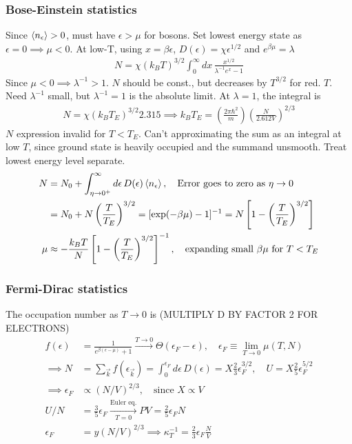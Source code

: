 \documentclass[a4paper, english, 12pt]{article}
\newcommand{\eps}{\epsilon}
\newcommand{\closed}[1]{\left( #1 \right)}
\newcommand{\bracket}[1]{\left[ #1 \right]}
\begin{document}
\begin{multicols*}{2}
\subsubsection*{\scriptsize Bose-Einstein statistics}
Since $\expval{n_\eps}>0$, must have $\eps>\mu$ for bosons. Set lowest energy state as $\eps=0\implies\mu<0$. At low-T, using $x=\beta\eps$, $D(\eps)=\chi \eps^{1/2}$ and $e^{\beta\mu}=\lambda$ 
\begin{align*}
    N = \chi (k_B T)^{3/2} \int_0^\infty dx\, \frac{x^{1/2}}{\lambda^{-1} e^x - 1}
\end{align*}
Since $\mu<0\implies\lambda^{-1}>1$. $N$ should be const., but decreases by $T^{3/2}$ for red. $T$. Need $\lambda^{-1}$ small, but $\lambda^{-1}=1$ is the absolute limit. At $\lambda=1$, the integral is 
\begin{align*}
    N = \chi (k_B T_E)^{3/2} 2.315 \implies k_B T_E = \left( \frac{2\pi\hbar^2}{m}\right) \left( \frac{N}{2.612V} \right)^{2/3}
\end{align*} 
$N$ expression invalid for $T<T_E$. Can't approximating the sum as an integral at low $T$, since ground state is heavily occupied and the summand unsmooth. Treat lowest energy level separate. 
\begin{align*}
    N &= N_0 + \int_{\eta\to0^+}^\infty d\eps\,D(\eps) \expval{n_\eps},\quad\text{Error goes to zero as } \eta\to0 \\
    &= N_0 + N \left(\frac{T}{T_E}\right)^{3/2} = [\exp(-\beta\mu)-1]^{-1} = N\bracket{1-\closed{\frac{T}{T_E}}^{3/2} } \\
    \mu &\approx -\frac{k_B T}{N}\bracket{1-\closed{\frac{T}{T_E}}^{3/2}}^{-1},\quad\text{expanding small }\beta\mu \text{ for } T<T_E
\end{align*}


\subsubsection*{\scriptsize Fermi-Dirac statistics}
The occupation number as $T\to0$ is (MULTIPLY D BY FACTOR 2 FOR ELECTRONS) 
\begin{align*}
    f(\eps)&=\frac{1}{e^{\beta(\eps-\mu)} +1} \xrightarrow{T\to0} \Theta(\eps_F-\eps),\quad \eps_F\equiv \lim_{T\to0}\mu(T,N) \\
    \implies N&=\sum_{\vec{k}} f(\eps_{\vec{k}}) = \int_0^{\eps_F} d\eps\, D(\eps) = X \frac{2}{3} \eps_F^{3/2},\quad U=X \frac{2}{5} \eps_F^{5/2} \\
    \implies \eps_F & \propto (N/V)^{2/3}, \quad \text{since } X\propto V \\
    U/N &= \frac{3}{5}\eps_F \xrightarrow[T=0]{\text{Euler eq.}} PV=\frac{2}{5}\eps_F N \\ 
    \eps_F &= y(N/V)^{2/3}\implies \kappa_T^{-1}= \frac{2}{3}\eps_F \frac{N}{V}
\end{align*}



\end{multicols*}
\end{document}
